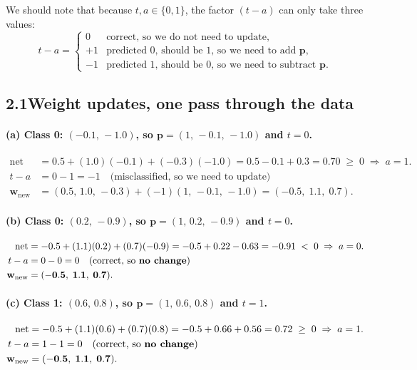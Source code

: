 \documentclass[11pt]{article}
\newcommand{\net}{\mathrm{net}}
\newcommand{\bw}{\mathbf{w}}
\newcommand{\bp}{\mathbf{p}}
\begin{document}
We should note that because $t, a \in \{0,1\}$, the factor $(t - a)$ can only take three
values:
\[
t - a =
\begin{cases}
0 & \text{correct, so we do not need to update,} \\
+1 & \text{predicted 0, should be 1, so we need to add } \bp, \\
-1 & \text{predicted 1, should be 0, so we need to subtract } \bp .
\end{cases}
\]

\subsection*{2.1\quad Weight updates, one pass through the data}

\paragraph{(a) Class 0: $(-0.1,\,-1.0)$, so $\bp = (1,\,-0.1,\,-1.0)$ and $t=0$.}
\begin{align*}
\net &= 0.5 + (1.0)(-0.1) + (-0.3)(-1.0) = 0.5 - 0.1 + 0.3 = 0.70 \;\ge\; 0 \;\Rightarrow\; a = 1 .\\
t - a &= 0 - 1 = -1 \quad \text{(misclassified, so we need to update)}\\
\bw_{\text{new}} &= (0.5,\,1.0,\,-0.3) + (-1)(1,\,-0.1,\,-1.0)
= \mathbf{(-0.5,\;1.1,\;0.7)} .
\end{align*}

\paragraph{(b) Class 0: $(0.2,\,-0.9)$, so $\bp = (1,\,0.2,\,-0.9)$ and $t=0$.}
\begin{align*}
\net &= -0.5 + (1.1)(0.2) + (0.7)(-0.9) = -0.5 + 0.22 - 0.63 = -0.91 \;<\; 0 \;\Rightarrow\; a = 0 .\\
t - a &= 0 - 0 = 0 \quad \text{(correct, so \textbf{no change})}\\
\bw_{\text{new}} &= \mathbf{(-0.5,\;1.1,\;0.7)} .
\end{align*}

\paragraph{(c) Class 1: $(0.6,\,0.8)$, so $\bp = (1,\,0.6,\,0.8)$ and $t=1$.}
\begin{align*}
\net &= -0.5 + (1.1)(0.6) + (0.7)(0.8) = -0.5 + 0.66 + 0.56 = 0.72 \;\ge\; 0 \;\Rightarrow\; a = 1 .\\
t - a &= 1 - 1 = 0 \quad \text{(correct, so \textbf{no change})}\\
\bw_{\text{new}} &= \mathbf{(-0.5,\;1.1,\;0.7)} .
\end{align*}
\end{document}
